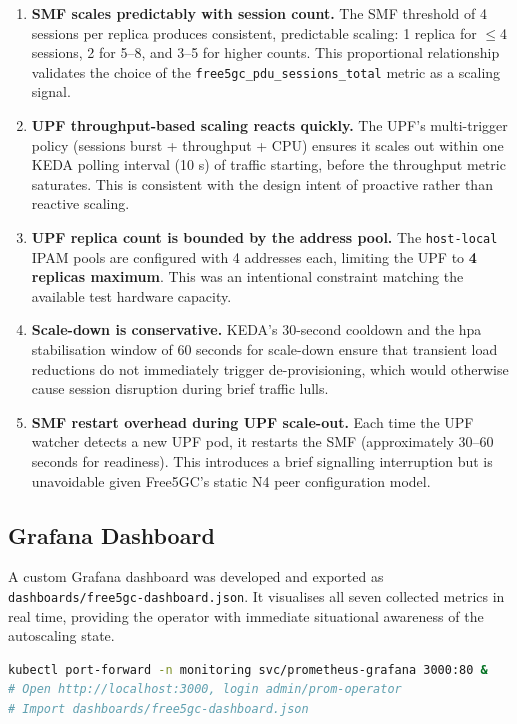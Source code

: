 \begin{enumerate}
  \item \textbf{SMF scales predictably with session count.} The SMF threshold of 4 sessions per replica produces consistent, predictable scaling: 1 replica for $\leq$4 sessions, 2 for 5–8, and 3–5 for higher counts. This proportional relationship validates the choice of the \texttt{free5gc\_pdu\_sessions\_total} metric as a scaling signal.

  \item \textbf{UPF throughput-based scaling reacts quickly.} The UPF's multi-trigger policy (sessions burst + throughput + CPU) ensures it scales out within one KEDA polling interval (10 s) of traffic starting, before the throughput metric saturates. This is consistent with the design intent of proactive rather than reactive scaling.

  \item \textbf{UPF replica count is bounded by the address pool.} The \texttt{host-local} IPAM pools are configured with 4 addresses each, limiting the UPF to \textbf{4 replicas maximum}. This was an intentional constraint matching the available test hardware capacity.

  \item \textbf{Scale-down is conservative.} KEDA's 30-second cooldown and the \gls{hpa} stabilisation window of 60 seconds for scale-down ensure that transient load reductions do not immediately trigger de-provisioning, which would otherwise cause session disruption during brief traffic lulls.

  \item \textbf{SMF restart overhead during UPF scale-out.} Each time the UPF watcher detects a new UPF pod, it restarts the SMF (approximately 30–60 seconds for readiness). This introduces a brief signalling interruption but is unavoidable given Free5GC's static N4 peer configuration model.
\end{enumerate}

\subsection{Grafana Dashboard}

A custom Grafana dashboard was developed and exported as \texttt{dashboards/free5gc-dashboard.json}. It visualises all seven collected metrics in real time, providing the operator with immediate situational awareness of the autoscaling state.

\begin{lstlisting}[language=bash, caption={Importing the custom Grafana dashboard}, label={lst:grafana_import}]
kubectl port-forward -n monitoring svc/prometheus-grafana 3000:80 &
# Open http://localhost:3000, login admin/prom-operator
# Import dashboards/free5gc-dashboard.json
\end{lstlisting}


